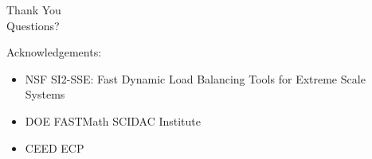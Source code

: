 \documentclass[aspectratio=169]{beamer}
\begin{document}
\begin{frame}
  \begin{center}
    {\huge
      Thank You\\
      \bigskip
      \bigskip
      \bigskip
      \bigskip
      \bigskip
      \huge
      Questions?\\
      \bigskip
      \bigskip
      \bigskip
    }
  \end{center}
  \large
  Acknowledgements:\\
  \begin{itemize}
    \item NSF SI2-SSE: Fast Dynamic Load Balancing Tools for Extreme Scale Systems
    \item DOE FASTMath SCIDAC Institute
    \item CEED ECP
  \end{itemize}
\end{frame}
\end{document}
